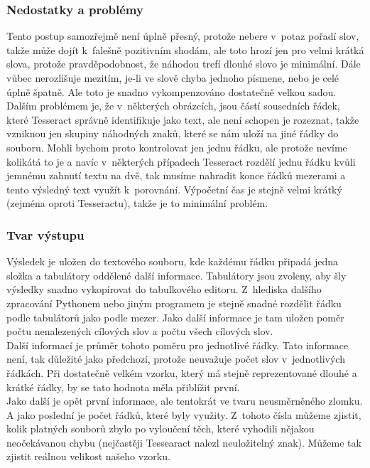 \documentclass[12pt]{report}			%
\begin{document}
	 \subsubsection{Nedostatky a problémy}
	Tento postup samozřejmě není úplně přesný, protože nebere v~potaz pořadí slov, takže může dojít k~falešně pozitivním shodám, ale toto hrozí jen pro velmi krátká slova, protože pravděpodobnost, že náhodou trefí  dlouhé slovo je minimální. Dále vůbec nerozlišuje mezitím, je-li ve slově chyba jednoho písmene, nebo je celé úplně špatně. Ale toto je snadno vykompenzováno dostatečně velkou sadou.\\	
	Dalším problémem je, že v~některých obrázcích, jsou částí sousedních řádek, které Tesseract správně identifikuje jako text, ale není schopen je rozeznat, takže vzniknou jen skupiny náhodných znaků, které se nám uloží na jiné řádky do souboru. Mohli bychom proto kontrolovat jen jednu řádku, ale protože nevíme kolikátá to je a navíc v~některých případech Tesseract rozdělí jednu řádku kvůli jemnému zahnutí textu na dvě, tak musíme nahradit konce řádků mezerami a tento výsledný text využít k~porovnání. Výpočetní čas je stejně velmi krátký (zejména oproti Tesseractu), takže je to minimální problém.\\
	\subsubsection{Tvar výstupu}
	Výsledek je uložen do textového souboru, kde každému řádku připadá jedna složka a tabulátory oddělené další informace. Tabulátory jsou zvoleny, aby šly výsledky snadno vykopírovat do tabulkového editoru. Z~hlediska dalšího zpracování Pythonem nebo jiným programem je stejně snadné rozdělit řádku podle tabulátorů jako podle mezer. Jako další informace je tam uložen poměr počtu nenalezených cílových slov a počtu všech cílových slov. \\Další informací je průměr tohoto poměru pro jednotlivé řádky. Tato informace není, tak důležité jako předchozí, protože neuvažuje  počet slov v~jednotlivých řádkách. Při dostatečně velkém vzorku, který má stejně reprezentované dlouhé a krátké řádky, by se tato hodnota měla přiblížit první. \\Jako další je opět první informace, ale tentokrát ve tvaru neusměrněného zlomku. A jako poslední je počet řádků, které byly využity. Z~tohoto čísla můžeme zjistit, kolik platných souborů zbylo po vyloučení těch, které vyhodili nějakou neočekávanou chybu (nejčastěji Tessearact nalezl neuložitelný znak). Můžeme tak zjistit reálnou velikost našeho vzorku.
\end{document}
